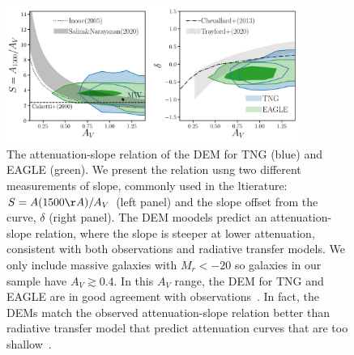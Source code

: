 \begin{figure}
\begin{center}
    \includegraphics[width=0.85\textwidth]{figs/abc_slope_AV.pdf}
    \caption{\label{fig:slope}
    The attenuation-slope relation of the DEM for TNG (blue) and EAGLE (green).
    We present the relation usng two different measurements of slope, 
    commonly used in the ltierature: $S = A(1500\AA)/A_V$ (left panel) and
    the slope offset from the \cite{calzetti2001} curve, $\delta$ (right panel).
    The DEM moodels predict an attenuation-slope relation, where the slope is
    steeper at lower attenuation, consistent with both observations and
    radiative transfer models. We only include massive galaxies with $M_r <
    -20$ so galaxies in our sample have $A_V \gtrsim 0.4$. In this $A_V$ range,
    the DEM for TNG and EAGLE are in good agreement with observations~\cite{salim2020}. 
    In fact, the DEMs match the observed attenuation-slope relation better 
    than radiative transfer model that predict attenuation curves that are
    too shallow~\citep{inoue2005, chevallard2013, trayford2020}.
    }
\end{center}
\end{figure}



